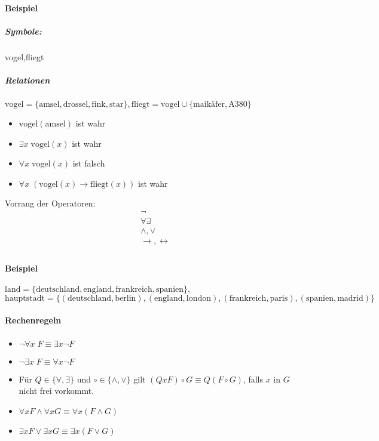 \documentclass[a4paper]{scrartcl}
\begin{document}
\paragraph{Beispiel}
\subparagraph{Symbole:} vogel,fliegt
\subparagraph{Relationen} $\text{vogel} = \{\text{amsel},\text{drossel},\text{fink},\text{star}\}, \text{fliegt} = \text{vogel} \cup \{\text{maikäfer},\text{A380}\}$
\begin{itemize}
\item $\text{vogel}(\text{amsel})$ ist wahr
\item $\exists x \; \text{vogel}(x)$ ist wahr
\item $\forall x \; \text{vogel}(x)$ ist falsch
\item $\forall x \; (\text{vogel}(x) \rightarrow \text{fliegt} (x))$ ist wahr
\end{itemize}

Vorrang der Operatoren:
\[ \begin{array}{c}
\neg \\
\forall \exists\\
\wedge, \vee\\
\rightarrow  , \leftrightarrow\\
\end{array}
\]

\paragraph{Beispiel} $\text{land} = \{\text{deutschland},\text{england},\text{frankreich},\text{spanien}\},$\\ $ \text{hauptstadt} = \{(\text{deutschland},\text{berlin}),(\text{england},\text{london}),(\text{frankreich},\text{paris}),(\text{spanien},\text{madrid}) \}$

\paragraph{Rechenregeln} 
\begin{itemize}
\item $\neg \forall x \; F \equiv \exists x \neg F$
\item $\neg \exists x \; F \equiv \forall x \neg F$
\item Für $Q \in \{ \forall, \exists \}$ und $\circ \in \{ \wedge, \vee \}$ gilt $(Q x F ) \circ G \equiv Q ( F \circ G )$, falls $x$ in $G$ nicht frei vorkommt.
\item $\forall x F \wedge \forall x G \equiv \forall x (F \wedge G)$
\item $\exists x F \vee \exists x G \equiv \exists x (F \vee G )$
\end{itemize}
\end{document}
